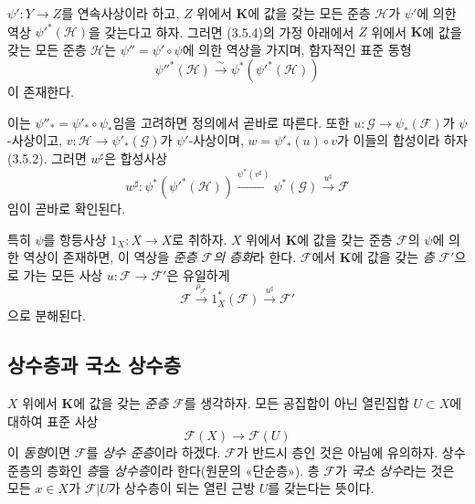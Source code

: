 \begin{env}[3.5.5]
\label{0.3.5.5-ko}
$\psi':Y\to Z$를 연속사상이라 하고, $Z$ 위에서 $\mathbf K$에 값을 갖는 모든 준층 $\mathcal H$가 $\psi'$에 의한 역상 $\psi'^*(\mathcal H)$을 갖는다고 하자. 그러면 (3.5.4)의 가정 아래에서 $Z$ 위에서 $\mathbf K$에 값을 갖는 모든 준층 $\mathcal H$는 $\psi''=\psi'\circ\psi$에 의한 역상을 가지며, 함자적인 표준 동형
\begin{equation*}
  \psi''^*(\mathcal H)\xrightarrow{\sim}
  \psi^*(\psi'^*(\mathcal H))
\tag{3.5.5.1}\label{0.3.5.5.1-ko}
\end{equation*}
이 존재한다.


이는 $\psi''_*=\psi'_*\circ\psi_*$임을 고려하면 정의에서 곧바로 따른다. 또한 $u:\mathcal G\to\psi_*(\mathcal F)$가 $\psi$-사상이고, $v:\mathcal H\to\psi'_*(\mathcal G)$가 $\psi'$-사상이며, $w=\psi'_*(u)\circ v$가 이들의 합성이라 하자(3.5.2). 그러면 $w^\sharp$은 합성사상
\[
  w^\sharp:\psi^*(\psi'^*(\mathcal H))
  \xrightarrow{\psi^*(v^\sharp)}
  \psi^*(\mathcal G)
  \xrightarrow{u^\sharp}\mathcal F
\]
임이 곧바로 확인된다.
\end{env}

\begin{env}[3.5.6]
\label{0.3.5.6-ko}
특히 $\psi$를 항등사상 $1_X:X\to X$로 취하자. $X$ 위에서 $\mathbf K$에 값을 갖는 준층 $\mathcal F$의 $\psi$에 의한 역상이 존재하면, 이 역상을 \emph{준층 $\mathcal F$의 층화}라 한다. $\mathcal F$에서 $\mathbf K$에 값을 갖는 \emph{층} $\mathcal F'$으로 가는 모든 사상 $u:\mathcal F\to\mathcal F'$은 유일하게
\[
  \mathcal F\xrightarrow{\rho_{\mathcal F}}
  1_X^*(\mathcal F)\xrightarrow{u^\sharp}\mathcal F'
\]
으로 분해된다.
\end{env}

\subsection{상수층과 국소 상수층}
\label{subsection:0.3.6-ko}

\begin{env}[3.6.1]
\label{0.3.6.1-ko}
$X$ 위에서 $\mathbf K$에 값을 갖는 \emph{준층} $\mathcal F$를 생각하자. 모든 공집합이 아닌 열린집합 $U\subset X$에 대하여 표준 사상
\[
  \mathcal F(X)\longrightarrow\mathcal F(U)
\]
이 \emph{동형}이면 $\mathcal F$를 \emph{상수 준층}이라 하겠다. $\mathcal F$가 반드시 층인 것은 아님에 유의하자. 상수 준층의 층화인 \emph{층}을 \emph{상수층}이라 한다(원문의 «단순층»). 층 $\mathcal F$가 \emph{국소 상수}라는 것은 모든 $x\in X$가 $\mathcal F|U$가 상수층이 되는 열린 근방 $U$를 갖는다는 뜻이다.
\end{env}

